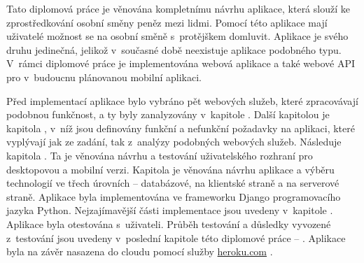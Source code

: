 \begin{introduction}
Tato diplomová práce je věnována kompletnímu návrhu aplikace, která slouží ke zprostředkování osobní směny peněz mezi lidmi. Pomocí této aplikace mají uživatelé možnost se na osobní směně s~protějškem domluvit. Aplikace je svého druhu jedinečná, jelikož v~současné době neexistuje aplikace podobného typu. V~rámci diplomové práce je implementována webová aplikace a také webové API pro v~budoucnu plánovanou mobilní aplikaci.

Před implementací aplikace bylo vybráno pět webových služeb, které zpracovávají podobnou funkčnost, a ty byly zanalyzovány v~kapitole \textit{}. Další kapitolou je kapitola \textit{}, v~níž jsou definovány funkční a nefunkční požadavky na aplikaci, které vyplývají jak ze zadání, tak z~analýzy podobných webových služeb. Následuje kapitola \textit{}. Ta je věnována návrhu a testování uživatelského rozhraní pro desktopovou a mobilní verzi. Kapitola \textit{} je věnována návrhu aplikace a výběru technologií ve třech úrovních -- databázové, na klientské straně a na serverové straně. Aplikace byla implementována ve frameworku Django programovacího jazyka Python. Nejzajímavější části implementace jsou uvedeny v~kapitole \textit{}. Aplikace byla otestována s~uživateli. Průběh testování a důsledky vyvozené z~testování jsou uvedeny v~poslední kapitole této diplomové práce -- \textit{}. Aplikace byla na závěr nasazena do cloudu pomocí služby \url{heroku.com} \cite{heroku}.
\end{introduction}